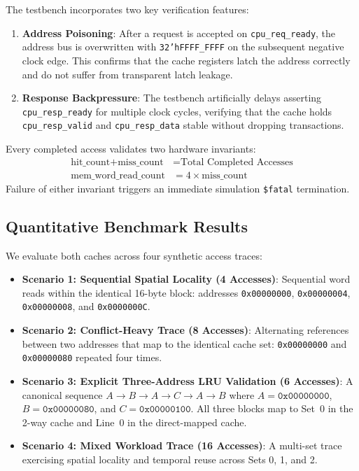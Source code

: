 \documentclass[conference]{IEEEtran}
\begin{document}
The testbench incorporates two key verification features:
\begin{enumerate}
    \item \textbf{Address Poisoning}: After a request is accepted on \texttt{cpu\_req\_ready}, the address bus is overwritten with \texttt{32'hFFFF\_FFFF} on the subsequent negative clock edge. This confirms that the cache registers latch the address correctly and do not suffer from transparent latch leakage.
    \item \textbf{Response Backpressure}: The testbench artificially delays asserting \texttt{cpu\_resp\_ready} for multiple clock cycles, verifying that the cache holds \texttt{cpu\_resp\_valid} and \texttt{cpu\_resp\_data} stable without dropping transactions.
\end{enumerate}

Every completed access validates two hardware invariants:
\begin{align}
\text{hit\_count} + \text{miss\_count} &= \text{Total Completed Accesses} \\
\text{mem\_word\_read\_count} &= 4 \times \text{miss\_count}
\end{align}
Failure of either invariant triggers an immediate simulation \texttt{\$fatal} termination.

\subsection{Quantitative Benchmark Results}
We evaluate both caches across four synthetic access traces:
\begin{itemize}
    \item \textbf{Scenario 1: Sequential Spatial Locality (4 Accesses)}: Sequential word reads within the identical 16-byte block: addresses \texttt{0x00000000}, \texttt{0x00000004}, \texttt{0x00000008}, and \texttt{0x0000000C}.
    \item \textbf{Scenario 2: Conflict-Heavy Trace (8 Accesses)}: Alternating references between two addresses that map to the identical cache set: \texttt{0x00000000} and \texttt{0x00000080} repeated four times.
    \item \textbf{Scenario 3: Explicit Three-Address LRU Validation (6 Accesses)}: A canonical sequence $A \to B \to A \to C \to A \to B$ where $A = \texttt{0x00000000}$, $B = \texttt{0x00000080}$, and $C = \texttt{0x00000100}$. All three blocks map to Set~0 in the 2-way cache and Line~0 in the direct-mapped cache.
    \item \textbf{Scenario 4: Mixed Workload Trace (16 Accesses)}: A multi-set trace exercising spatial locality and temporal reuse across Sets 0, 1, and 2.
\end{itemize}
\end{document}
